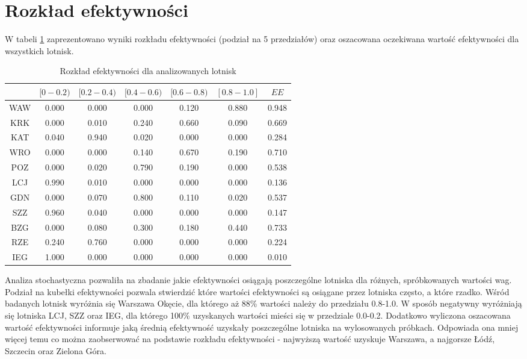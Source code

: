 \documentclass[a4paper,12pt]{article}
\begin{document}
\section{Rozkład efektywności}
W tabeli \ref{tab:efficiency-distribution} zaprezentowano wyniki rozkładu efektywności (podział na 5 przedziałów) oraz oszacowana oczekiwana wartość efektywności dla wszystkich lotnisk.

\begin{table}[H]
\begin{tabular}{c|ccccc|c}
\hline
    & $[0-0.2)$ & $[0.2-0.4)$ & $[0.4-0.6)$ & $[0.6-0.8)$ & $[0.8-1.0]$ & $EE$    \\ \hline
    WAW & 0.000 & 0.000 & 0.000 & 0.120 & 0.880 & 0.948 \\
    KRK & 0.000 & 0.010 & 0.240 & 0.660 & 0.090 & 0.669 \\
    KAT & 0.040 & 0.940 & 0.020 & 0.000 & 0.000 & 0.284 \\
    WRO & 0.000 & 0.000 & 0.140 & 0.670 & 0.190 & 0.710 \\
    POZ & 0.000 & 0.020 & 0.790 & 0.190 & 0.000 & 0.538 \\
    LCJ & 0.990 & 0.010 & 0.000 & 0.000 & 0.000 & 0.136 \\
    GDN & 0.000 & 0.070 & 0.800 & 0.110 & 0.020 & 0.537 \\
    SZZ & 0.960 & 0.040 & 0.000 & 0.000 & 0.000 & 0.147 \\
    BZG & 0.000 & 0.080 & 0.300 & 0.180 & 0.440 & 0.733 \\
    RZE & 0.240 & 0.760 & 0.000 & 0.000 & 0.000 & 0.224 \\
    IEG & 1.000 & 0.000 & 0.000 & 0.000 & 0.000 & 0.010 \\
\hline
\end{tabular}
\caption{Rozkład efektywności dla analizowanych lotnisk}
\label{tab:efficiency-distribution}
\end{table}

\noindent Analiza stochastyczna pozwaliła na zbadanie jakie efektywności osiągają poszczególne lotniska dla różnych, spróbkowanych wartości wag.
Podział na kubełki efektywności pozwala stwierdzić które wartości efektywności są osiągane przez lotniska często, a które rzadko.
Wśród badanych lotnisk wyróżnia się Warszawa Okęcie, dla którego aż 88\% wartości należy do przedziału 0.8-1.0.
W sposób negatywny wyróżniają się lotniska LCJ, SZZ oraz IEG, dla którego 100\% uzyskanych wartości mieści się w przedziale 0.0-0.2.
Dodatkowo wyliczona oszacowana wartość efektywności informuje jaką średnią efektywność uzyskały poszczególne lotniska na wylosowanych próbkach.
Odpowiada ona mniej więcej temu co można zaobserwować na podstawie rozkładu efektywności - najwyższą wartość uzyskuje Warszawa, a najgorsze Łódź, Szczecin oraz Zielona Góra.
\end{document}
